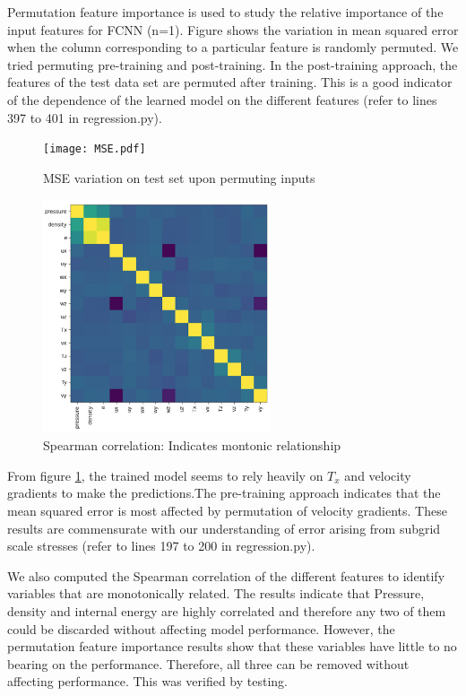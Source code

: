 \documentclass{article}
\begin{document}
Permutation feature importance is used to study the relative importance of the input features for FCNN (n=1). Figure \label{fig:perm} shows the variation in mean squared error when the column corresponding to a particular feature is randomly permuted. We tried permuting pre-training and post-training. In the post-training approach, the features of the test data set are permuted after training. This is a good indicator of the dependence of the learned model on the different features (refer to lines 397 to 401 in regression.py). 

	\begin{figure}
	\centering
		\texttt{[image: MSE.pdf]}
		\caption{MSE variation on test set upon permuting inputs}
		\label{fig:perm}
	\end{figure}
	
		\begin{figure}
		\centering
    	\includegraphics[width=0.6\textwidth]{figures/spearman_heatmap.png}
    	\caption{Spearman correlation: Indicates montonic relationship}
    \end{figure}

From figure \ref{fig:perm}, the trained model seems to rely heavily on $T_x$ and velocity gradients to make the predictions.The pre-training approach indicates that the mean squared error is most affected by permutation of velocity gradients. These results are commensurate with our understanding of error arising from subgrid scale stresses (refer to lines 197 to 200 in regression.py).

We also computed the Spearman correlation of the different features to identify variables that are monotonically related. The results indicate that Pressure, density and internal energy are highly correlated and therefore any two of them could be discarded without affecting model performance. However, the permutation feature importance results show that these variables have little to no bearing on the performance. Therefore, all three can be removed without affecting performance. This was verified by testing. 
\end{document}
